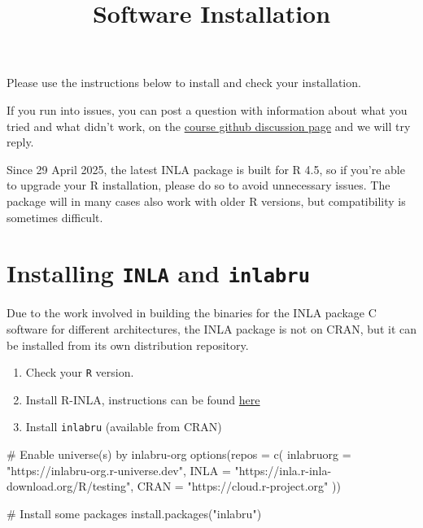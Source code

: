 \documentclass[
  letterpaper,
  DIV=11,
  numbers=noendperiod]{scrartcl}
\title{Software Installation}
\author{}
\date{}
\makeatletter
\newenvironment{Shaded}{\begin{snugshade}}{\end{snugshade}}
\newcommand{\AttributeTok}[1]{\textcolor[rgb]{0.40,0.45,0.13}{#1}}
\newcommand{\CommentTok}[1]{\textcolor[rgb]{0.37,0.37,0.37}{#1}}
\newcommand{\FunctionTok}[1]{\textcolor[rgb]{0.28,0.35,0.67}{#1}}
\newcommand{\NormalTok}[1]{\textcolor[rgb]{0.00,0.23,0.31}{#1}}
\newcommand{\StringTok}[1]{\textcolor[rgb]{0.13,0.47,0.30}{#1}}
\renewcommand{\maketitle}{\bgroup\setlength{\parindent}{0pt}
\begin{flushleft}
  {\sffamily\huge\textbf{\MakeUppercase{\@title}}} \vspace{0.3cm} \newline
  {\Large {\@subtitle}} \newline
  \@author
\end{flushleft}\egroup
}
\makeatother
\begin{document}
\maketitle

\pagestyle{mystyle}


Please use the instructions below to install and check your
installation.

If you run into issues, you can post a question with information about
what you tried and what didn't work, on the
\href{https://github.com/inlabru-courses/NewCaledonia2026/discussions}{course
github discussion page} and we will try reply.

Since 29 April 2025, the latest INLA package is built for R 4.5, so if
you're able to upgrade your R installation, please do so to avoid
unnecessary issues. The package will in many cases also work with older
R versions, but compatibility is sometimes difficult.

\section{\texorpdfstring{Installing \texttt{INLA} and
\texttt{inlabru}}{Installing INLA and inlabru}}\label{installing-inla-and-inlabru}

Due to the work involved in building the binaries for the INLA package C
software for different architectures, the INLA package is not on CRAN,
but it can be installed from its own distribution repository.

\begin{enumerate}
\def\labelenumi{\arabic{enumi}.}
\item
  Check your \texttt{R} version.
\item
  Install R-INLA, instructions can be found
  \href{https://www.r-inla.org/download-install}{here}
\item
  Install \texttt{inlabru} (available from CRAN)
\end{enumerate}

\begin{Shaded}
\begin{Highlighting}[]
\CommentTok{\# Enable universe(s) by inlabru{-}org}
\FunctionTok{options}\NormalTok{(}\AttributeTok{repos =} \FunctionTok{c}\NormalTok{(}
  \AttributeTok{inlabruorg =} \StringTok{"https://inlabru{-}org.r{-}universe.dev"}\NormalTok{,}
  \AttributeTok{INLA =} \StringTok{"https://inla.r{-}inla{-}download.org/R/testing"}\NormalTok{,}
  \AttributeTok{CRAN =} \StringTok{"https://cloud.r{-}project.org"}
\NormalTok{))}

\CommentTok{\# Install some packages}
\FunctionTok{install.packages}\NormalTok{(}\StringTok{"inlabru"}\NormalTok{)}
\end{Highlighting}
\end{Shaded}
\end{document}
